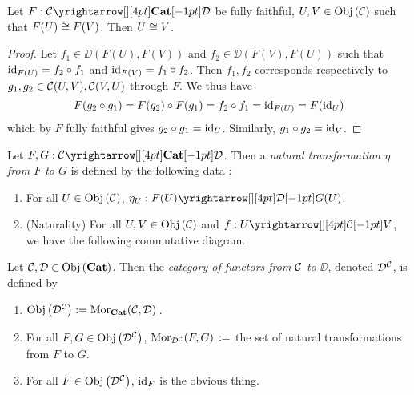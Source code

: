 \begin{prop}
  
  Let $F : \map{\CC}{\DD}{\CAT}{}$ be fully faithful,
  $U, V \in \obj{\CC}$ such that $F(U) \iso F(V)$.
  Then $U \iso V$. 
\end{prop}
\begin{proof}
  Let $f_1 \in \DD(F(U),F(V))$ and $f_2 \in \DD(F(V),F(U))$ such that 
  $\id{F(U)} = f_2 \circ f_1$ and $\id{F(V)} = f_1 \circ f_2$. 
  Then $f_1, f_2$ corresponds respectively to $g_1, g_2 \in \CC(U,V), \CC(V,U)$
  through $F$. 
  We thus have 
  \[ 
    F(g_2 \circ g_1) = F(g_2) \circ F(g_1) = f_2 \circ f_1 = \id{F(U)}
    = F(\id{U})
  \]
  which by $F$ fully faithful gives $g_2 \circ g_1 = \id{U}$. 
  Similarly, $g_1 \circ g_2 = \id{V}$.
\end{proof}

\begin{dfn}
  
  Let $F, G : \map{\CC}{\DD}{\CAT}{}$. 
  Then a \emph{natural transformation $\eta$ from $F$ to $G$} is defined by 
  the following data : 
  \begin{enumerate}
    \item For all $U \in \obj{\CC}$, $\eta_U : \map{F(U)}{G(U)}{\DD}{}$. 
    \item (Naturality) 
    For all $U, V \in \obj{\CC}$ and $f : \map{U}{V}{\CC}{}$, 
    we have the following commutative diagram. \begin{figure}[H]
      \centering
    \end{figure}
  \end{enumerate}
\end{dfn}

\begin{dfn}
  
  Let $\CC, \DD \in \obj{\CAT}$. 
  Then the \emph{category of functors from $\CC$ to $\DD$},
  denoted $\DD^\CC$, is defined by 
  \begin{enumerate}
    \item $\obj{\DD^\CC} := \mor{\CC}{\DD}{\CAT}$. 
    \item For all $F, G \in \obj{\DD^\CC}$, 
    $\mor{F}{G}{\DD^\CC} := $
    the set of natural transformations from $F$ to $G$. 
    \item For all $F \in \obj{\DD^\CC}$, $\id{F}$ is the obvious thing.
  \end{enumerate}
\end{dfn}

